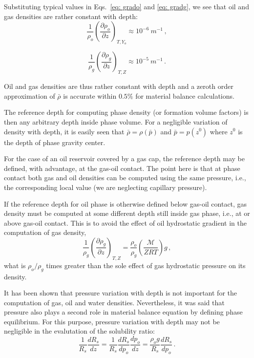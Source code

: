 \documentclass[final,authoryear,5p,times,twocolumn,10pt]{elsarticle}
\begin{document}
Substituting typical values in Eqs.~\eqref{eq: grado} and \eqref{eq: gradg}, we see that oil and gas densities are rather constant with depth:
\begin{equation}
\frac{1}{\rho_o}\left(\frac{\partial \rho_o}{\partial z}\right)_{T,Y_o} \approx 10^{-6}\ m^{-1} \, ,
\end{equation}

\begin{equation}
\frac{1}{\rho_g}\left(\frac{\partial \rho_g}{\partial z}\right)_{T,Z} \approx 10^{-5}\ m^{-1} \, .
\end{equation}

Oil and gas densities are thus rather constant with depth and a zeroth order approximation of $\bar{\rho}$ is accurate within $0.5\%$ for material balance calculations.

The reference depth for computing phase density (or formation volume factors) is then any arbitrary depth inside phase volume. For a negligible variation of density with depth, it is easily seen that $\bar{\rho} = \rho\left(\bar{p}\right)$ and $\bar{p}=p\left(z^0\right)$ where $z^0$ is the depth of phase gravity center.

For the case of an oil reservoir covered by a gas cap, the reference depth may be defined, with advantage, at the gas-oil contact. The point here is that at phase contact both gas and oil densities can be computed using the same pressure, i.e., the corresponding local value (we are neglecting capillary pressure). 

If the reference depth for oil phase is otherwise defined below gas-oil contact, gas density must be computed at some different depth still inside gas phase, i.e., at or above gas-oil contact. This is to avoid the effect of oil hydrostatic gradient in the computation of gas density,
\begin{equation}
\frac{1}{\rho_g}\left(\frac{\partial \rho_g}{\partial z}\right)_{T,Z} = \frac{\rho_o}{\rho_g}\left(\frac{\mathcal{M}}{Z R T}\right)g  \, ,
\end{equation}
what is $\rho_o / \rho_g$ times greater than the sole effect of gas hydrostatic pressure on its density.

It has been shown that pressure variation with depth is not important for the computation of gas, oil and water densities. Nevertheless, it was said that pressure also plays a second role in material balance equation by defining phase equilibrium. For this purpose, pressure variation with depth may not be negligible in the evalutation of the solubility ratio: 
\begin{equation}\label{eq: dRsdz1}
\frac{1}{R_s}\frac{d R_s}{dz} = \frac{1}{R_s}\frac{d R_s}{dp_o} \frac{dp_o}{dz} = \frac{\rho_o g}{R_s}\frac{dR_s}{dp_o} \, .
\end{equation}
\end{document}
